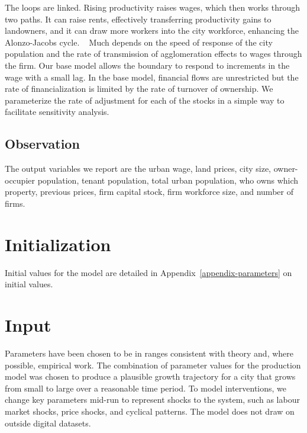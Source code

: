  
The loops are linked. Rising productivity raises wages, which then works through two paths. It can raise rents, effectively transferring productivity gains to landowners, and it can draw more workers into the city workforce, enhancing the \Gls{Alonzo-Jacobs cycle}. 
\
Much depends on the speed of response of the city population and the rate of transmission of agglomeration effects to wages through the firm. Our base model allows the boundary to respond to increments in the wage with a small lag. In the base model, financial flows are unrestricted but the rate of financialization is limited by the rate of turnover of ownership. We parameterize the rate of adjustment for each of the stocks in a simple way to facilitate sensitivity analysis.

\subsection{Observation}
The output variables we report are the urban wage, land prices, city size, owner-occupier population, tenant population, total urban population, who owns which property, previous prices, firm capital stock, firm workforce size, and number of firms.

\section{Initialization}
Initial values for the model are detailed in Appendix~\ref{appendix-parameters} on initial values.

\section{Input}
Parameters have been chosen to be in ranges consistent with theory and, where possible, empirical work. The combination of parameter values for the production model was chosen to produce a plausible growth trajectory for a city that grows from small to large over a reasonable time period. To model interventions, we change key parameters mid-run to represent shocks to the system, such as labour market shocks, price shocks, and cyclical patterns. %
The model does not draw on outside digital datasets. 

